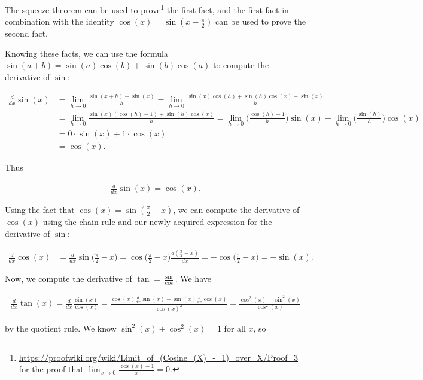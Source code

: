 The squeeze theorem can be used to prove\footnote{\url{https://proofwiki.org/wiki/Limit_of_(Cosine_(X)_-_1)_over_X/Proof_3} for the proof that $\lim_{x \rightarrow 0} \frac{\cos(x) - 1}{x} = 0$.} the first fact, and the first fact in combination with the identity $\cos(x) = \sin(x - \frac{\pi}{2})$ can be used to prove the second fact. 

Knowing these facts, we can use the formula $\sin(a + b) = \sin(a)\cos(b) + \sin(b)\cos(a)$ to compute the derivative of $\sin$:

\begin{align*}
    \frac{d}{dx}\sin(x)
    &= \lim_{h \rightarrow 0} \frac{\sin(x + h) - \sin(x)}{h}
    = \lim_{h \rightarrow 0} \frac{\sin(x)\cos(h) + \sin(h)\cos(x) - \sin(x)}{h} \\
    &= \lim_{h \rightarrow 0} \frac{\sin(x)(\cos(h) - 1) + \sin(h)\cos(x)}{h} 
    = \lim_{h \rightarrow 0}\Big( \frac{\cos(h) - 1}{h} \Big) \sin(x) + \lim_{h \rightarrow 0}\Big( \frac{\sin(h)}{h} \Big) \cos(x) \\
    &= 0 \cdot \sin(x) + 1 \cdot \cos(x) \\
    &= \cos(x).
\end{align*}

Thus 

\begin{align*}
    \frac{d}{dx} \sin(x) = \cos(x).
\end{align*}

Using the fact that $\cos(x) = \sin(\frac{\pi}{2} - x)$, we can compute the derivative of $\cos(x)$ using the chain rule and our newly acquired expression for the derivative of $\sin$:

\begin{align*}
    \frac{d}{dx} \cos(x) 
    &= \frac{d}{dx} \sin\Big(\frac{\pi}{2} - x\Big) 
    = \cos\Big(\frac{\pi}{2} - x\Big) \frac{d(\frac{\pi}{2} - x)}{dx}
    = -\cos\Big(\frac{\pi}{2} - x\Big) = -\sin(x). 
\end{align*}

Now, we compute the derivative of $\tan = \frac{\sin}{\cos}$. We have

\begin{align*}
    \frac{d}{dx} \tan(x)
    = \frac{d}{dx} \frac{\sin(x)}{\cos(x)} 
    = \frac{\cos(x) \frac{d}{dx} \sin(x) - \sin(x) \frac{d}{dx} \cos(x)}{\cos(x)^2} = \frac{\cos^2(x) + \sin^2(x)}{\cos^2(x)}
\end{align*}

by the quotient rule. We know $\sin^2(x) + \cos^2(x) = 1$ for all $x$, so

